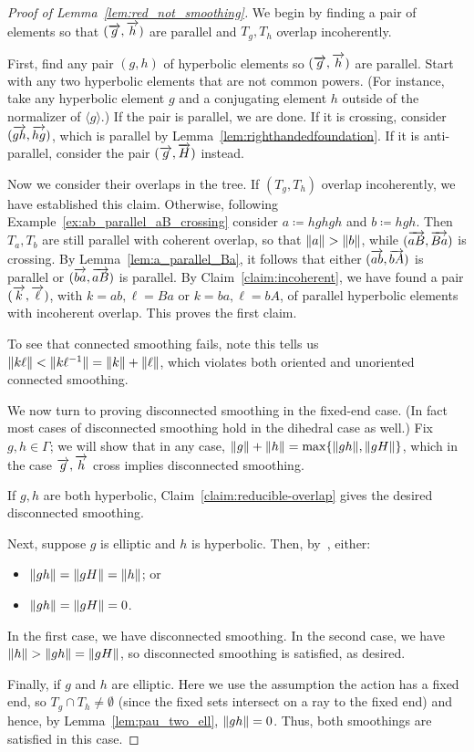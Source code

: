 \begin{proof}[Proof of Lemma~\ref{lem:red_not_smoothing}]
  We begin by finding a pair of elements so that $(\overrightarrow{g},\overrightarrow{h})$
  are parallel and $T_g,T_h$ overlap incoherently.

  First, find any pair $(g,h)$ of hyperbolic elements so $(\overrightarrow{g},\overrightarrow{h})$ are
parallel. Start with any two hyperbolic elements that
are not common powers. (For instance, take any hyperbolic element $g$
and a conjugating element $h$ outside of the normalizer of $\langle g \rangle$.)
If the pair is parallel, we are
done. If it is crossing, consider $(\overrightarrow{gh},\overrightarrow{hg})$, which is parallel by
Lemma~\ref{lem:righthandedfoundation}. If it is anti-parallel,
consider the pair $(\overrightarrow{g},\overrightarrow{H})$ instead.

Now we consider their overlaps in the tree. If $(T_g,T_h)$
overlap
incoherently, we have established this claim. Otherwise, following
Example~\ref{ex:ab_parallel_aB_crossing} consider $a \coloneqq hghgh$
and $b \coloneqq hgh$. Then $T_a,T_b$ are still parallel with coherent
overlap, so that
$\lVert a\rVert>\lVert b\rVert$, while
$(\overrightarrow{aB},\overrightarrow{Ba})$ is crossing. By Lemma~\ref{lem:a_parallel_Ba},
it follows that either $(\overrightarrow{ab},\overrightarrow{bA})$ is parallel or $(\overrightarrow{ba},\overrightarrow{aB})$ is parallel.
By Claim~\ref{claim:incoherent}, we have found a pair $(\overrightarrow{k},\overrightarrow{\ell})$, with
$k = ab, \ell = Ba$ or $k = ba, \ell = bA$, of parallel hyperbolic elements with
incoherent overlap. This proves the first claim.

To see that connected smoothing fails, note
this tells us $\lVert k\ell \rVert < \lVert k\ell^{-1}\rVert=\lVert k\rVert + \lVert\ell\rVert$, which violates both
oriented and unoriented connected smoothing.

We now turn to proving disconnected smoothing in the fixed-end case. (In
fact most cases of disconnected smoothing hold in the dihedral case
as well.) Fix $g,h\in\Gamma$; we will show that in any case, $\lVert g\rVert
+ \lVert h\rVert = \max\{\lVert gh\rVert,\lVert gH\rVert\}$, which in the case
$\overrightarrow{g},\overrightarrow{h}$ cross implies disconnected smoothing.

If $g,h$ are both hyperbolic,
Claim~\ref{claim:reducible-overlap} gives the desired disconnected
smoothing.

Next, suppose $g$ is elliptic and $h$ is hyperbolic.
Then, by~\cite[Lemma~6.5]{CM87:GroupActions}, either:
\begin{itemize}
\item $\lVert gh\rVert=\lVert gH\rVert=\lVert h\rVert$; or
\item $\lVert gh\rVert=\lVert gH\rVert=0$.
\end{itemize}
In the first case, we have disconnected smoothing. In the second case, we have $\lVert h\rVert > \lVert gh\rVert=\lVert gH\rVert$, so disconnected smoothing is satisfied, as desired.

Finally, if $g$ and $h$ are elliptic. Here we use the assumption the
action has a fixed end,
so $T_g \cap
T_h \ne \emptyset$ (since the fixed sets intersect on a ray to the
fixed end) and hence, by Lemma~\ref{lem:pau_two_ell},
$\lVert gh\rVert=0$.
Thus, both smoothings are satisfied in this case.
\end{proof}

